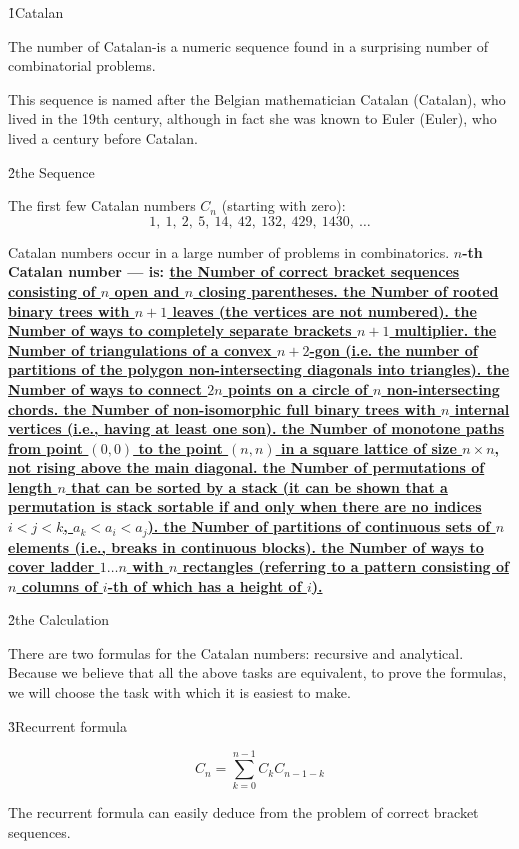 \h1{Catalan}

The number of Catalan-is a numeric sequence found in a surprising number of combinatorial problems.

This sequence is named after the Belgian mathematician Catalan (Catalan), who lived in the 19th century, although in fact she was known to Euler (Euler), who lived a century before Catalan.

\h2{the Sequence}

The first few Catalan numbers $C_n$ (starting with zero):
$$ 1,\ 1,\ 2,\ 5,\ 14,\ 42,\ 132,\ 429,\ 1430,\ \ldots $$

Catalan numbers occur in a large number of problems in combinatorics. \bf{$n$-th Catalan number} --- is:
\ul{
\li the Number of correct bracket sequences consisting of $n$ open and $n$ closing parentheses.
\li the Number of rooted binary trees with $n+1$ leaves (the vertices are not numbered).
\li the Number of ways to completely separate brackets $n+1$ multiplier.
\li the Number of triangulations of a convex $n+2$-gon (i.e. the number of partitions of the polygon non-intersecting diagonals into triangles).
\li the Number of ways to connect $2n$ points on a circle of $n$ non-intersecting chords.
\li the Number of non-isomorphic full binary trees with $n$ internal vertices (i.e., having at least one son).
\li the Number of monotone paths from point $(0,0)$ to the point $(n,n)$ in a square lattice of size $n \times n$, not rising above the main diagonal.
\li the Number of permutations of length $n$ that can be sorted by a stack (it can be shown that a permutation is stack sortable if and only when there are no indices $i<j<k$, $a_k<a_i<a_j$).
\li the Number of partitions of continuous sets of $n$ elements (i.e., breaks in continuous blocks).
\li the Number of ways to cover ladder $1 \ldots n$ with $n$ rectangles (referring to a pattern consisting of $n$ columns of $i$-th of which has a height of $i$).
}

\h2{the Calculation}

There are two formulas for the Catalan numbers: recursive and analytical. Because we believe that all the above tasks are equivalent, to prove the formulas, we will choose the task with which it is easiest to make.

\h3{Recurrent formula}

$$ C_n = \sum_{k=0}^{n-1} C_k C_{n-1-k} $$

The recurrent formula can easily deduce from the problem of correct bracket sequences.

